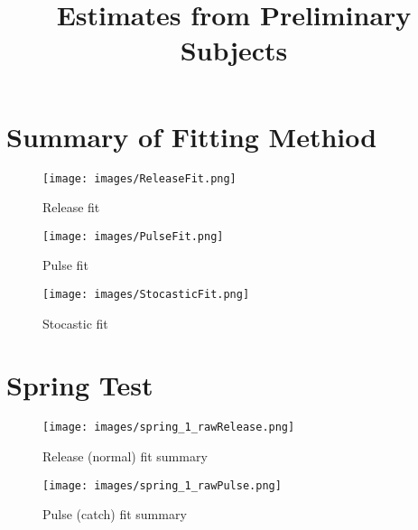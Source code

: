 \documentclass[12pt]{spie}
\title{Estimates from Preliminary Subjects}
\begin{document}


\maketitle

\section{Summary of Fitting Methiod}

\begin{figure}[H]
\begin{center}
\texttt{[image: images/ReleaseFit.png]}
\caption[]{Release fit}
\label{fig:releaseFit}
\end{center}
\end{figure}

\begin{figure}[H]
\begin{center}
\texttt{[image: images/PulseFit.png]}
\caption[]{Pulse fit}
\label{fig:pulseFit}
\end{center}
\end{figure}

\begin{figure}[H]
\begin{center}
\texttt{[image: images/StocasticFit.png]}
\caption[]{Stocastic fit}
\label{fig:stocasticFit}
\end{center}
\end{figure}

\section{Spring Test}

\begin{figure}[H]
\begin{center}
\texttt{[image: images/spring\_1\_rawRelease.png]}
\caption[]{Release (normal) fit summary}
\end{center}
\end{figure}

\begin{figure}[H]
\begin{center}
\texttt{[image: images/spring\_1\_rawPulse.png]}
\caption[]{Pulse (catch) fit summary}
\end{center}
\end{figure}
\end{document}
